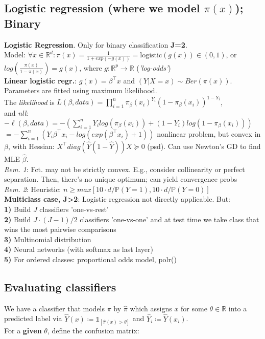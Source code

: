 \subsection*{Logistic regression (where we model $\pi(x)$); Binary}
\textbf{Logistic Regression}. Only for binary classification \textbf{J=2}. \\
Model: $\forall x \in \mathbb{R}^d: \pi(x)=\frac{1}{1+exp(-g(x))} = \text{logistic}(g(x)) \in (0,1)$, or \\
$log\left( \frac{\pi(x)}{1-\pi(x)} \right) = g(x)$, where $g: \mathbb{R}^p \to \mathbb{R}$ (\emph{'log-odds'}) \\
\textbf{Linear logistic regr.}: $g(x) = \beta^\intercal x$ and $(Y|X=x) \sim Ber\left(\pi(x)\right)$. Parameters are fitted using maximum likelihood. \\ 
The \emph{likelihood} is $L(\beta, data) = \prod_{i=1}^n \pi_\beta(x_i)^{Y_i}(1-\pi_\beta(x_i))^{1-Y_i}$, \\
and \emph{nll}: $-\ell(\beta, data) = -\left( \sum_{i=1}^n Y_i log(\pi_\beta(x_i)) + (1-Y_i)log(1-\pi_\beta(x_i)) \right)$ $= -\sum_{i=1}^n\left( Y_i \beta^\intercal x_i - log(exp(\beta^\intercal x_i)+1) \right)$ \textrightarrow nonlinear problem, but convex in $\beta$, with Hessian: $X^\intercal diag(\hat{Y}(1-\hat{Y}))X \succcurlyeq 0$ (psd). \textrightarrow Can use Newton's GD to find MLE $\hat{\beta}$.\\
\emph{Rem. 1}: Fct. may not be strictly convex. E.g., consider collinearity or perfect separation. Then, there's no unique optimum; can yield convergence probs\\
\emph{Rem. 2}: Heuristic: $n \geq max[10\cdot d/\mathbb{P}(Y=1),10\cdot d/\mathbb{P}(Y=0)]$ \\
\textbf{Multiclass case, J>2}: Logistic regression not directly applicable. But: \\
\textbf{1)} Build $J$ classifiers 'one-vs-rest'\\
\textbf{2)} Build $J\cdot (J-1)/2$ classifiers 'one-vs-one' and at test time we take class that wins the most pairwise comparisons \\
\textbf{3)} Multinomial distribution \\
\textbf{4)} Neural networks (with softmax as last layer) \\
\textbf{5)} For ordered classes: proportional odds model, polr()

\subsection*{Evaluating classifiers}
We have a classifier that models $\pi$ by $\hat{\pi}$ which assigns $x$ for some $\theta \in \mathbb{R}$ into a predicted label via $\hat{Y}(x) \coloneqq \mathds{1}_{[\hat{\pi}(x)>\theta]}$ and $\hat{Y}_i \coloneqq \hat{Y}(x_i)$. \\
For a \textbf{given} $\theta$, define the confusion matrix:

